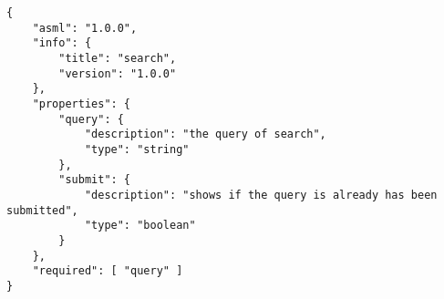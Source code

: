 \lstset{
  label=lis:search-schema, caption=Search model as JSON Schema document., 
  basicstyle=\ttfamily\footnotesize, frame=single, captionpos=b,
  xleftmargin=.01\textwidth, xrightmargin=.01\textwidth,
  breaklines=true
}
\begin{lstlisting}
{
    "asml": "1.0.0",
    "info": {
        "title": "search",
        "version": "1.0.0"
    },
    "properties": {
        "query": {
            "description": "the query of search",
            "type": "string"
        },
        "submit": {
            "description": "shows if the query is already has been submitted",
            "type": "boolean"
        }
    },
    "required": [ "query" ]
}
\end{lstlisting}